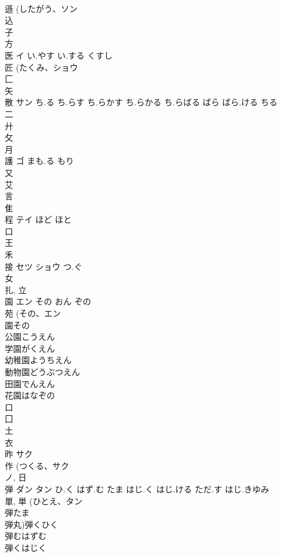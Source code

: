\documentclass[8pt]{extreport}
\begin{document}
\begin{CJK}{UTF8}{min}
\\	遜 (したがう、ソン 
\\	込 
\\	子 
\\	方 
\\	医	イ	い.やす い.する くすし	
\\	匠 (たくみ、ショウ 
\\	匚 
\\	矢 
\\	散	サン	ち.る ち.らす ち.らかす ち.らかる ち.らばる ばら ばら.ける ちる	
\\	二 
\\	廾 
\\	攵 
\\	月 
\\	護	ゴ	まも.る もり	
\\	又 
\\	艾 
\\	言 
\\	隹 
\\	程	テイ	ほど ほと	
\\	口 
\\	王 
\\	禾 
\\	接	セツ ショウ	つ.ぐ	
\\	女 
\\	扎, 立 
\\	園	エン	その おん ぞの	
\\	苑 (その、エン 
\\	園その 
\\	公園こうえん 
\\	学園がくえん 
\\	幼稚園ようちえん 
\\	動物園どうぶつえん 
\\	田園でんえん 
\\	花園はなぞの 
\\	口 
\\	囗 
\\	土 
\\	衣 
\\	昨	サク		
\\	作 (つくる、サク 
\\	ノ, 日 
\\	弾	ダン タン	ひ.く はず.む たま はじ.く はじ.ける ただ.す はじ.きゆみ	
\\	單, 単 (ひとえ、タン 
\\	弾たま
\\	弾丸)弾くひく
\\	弾むはずむ
\\	弾くはじく

\end{CJK}
\end{document}
